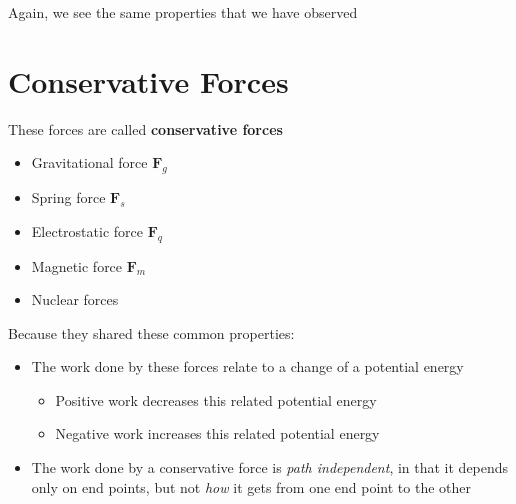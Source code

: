 \documentclass[11pt]{article}
\begin{document}
Again, we see the same properties that we have observed 



\section{Conservative Forces}

These forces are called \textbf{conservative forces}
\begin{itemize}[nosep]
\item Gravitational force $\mathbf F_g$
\item Spring force $\mathbf F_s$
\item Electrostatic force $\mathbf F_q$
\item Magnetic force $\mathbf F_m$
\item Nuclear forces
\end{itemize}
Because they shared these common properties:
\begin{itemize}[nosep]
\item The work done by these forces relate to a change of a potential energy
  \begin{itemize}[nosep]
  \item Positive work decreases this related potential energy
  \item Negative work increases this related potential energy
  \end{itemize}
\item The work done by a conservative force is \emph{path independent}, in that
  it depends only on end points, but not \emph{how} it gets from one end point
  to the other
\end{itemize}
\end{document}
